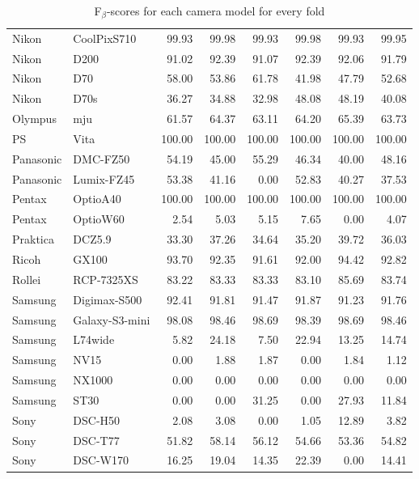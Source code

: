 \begin{table}[h]
{\begin{tabular}{|l|l|r|r|r|r|r|r|}
Nikon & CoolPixS710 & 99.93 & 99.98 & 99.93 & 99.98 & 99.93 & 99.95\\
Nikon & D200 & 91.02 & 92.39 & 91.07 & 92.39 & 92.06 & 91.79\\
Nikon & D70 & 58.00 & 53.86 & 61.78 & 41.98 & 47.79 & 52.68\\
Nikon & D70s & 36.27 & 34.88 & 32.98 & 48.08 & 48.19 & 40.08\\
Olympus & mju & 61.57 & 64.37 & 63.11 & 64.20 & 65.39 & 63.73\\
PS & Vita & 100.00 & 100.00 & 100.00 & 100.00 & 100.00 & 100.00\\
Panasonic & DMC-FZ50 & 54.19 & 45.00 & 55.29 & 46.34 & 40.00 & 48.16\\
Panasonic & Lumix-FZ45 & 53.38 & 41.16 & 0.00 & 52.83 & 40.27 & 37.53\\
Pentax & OptioA40 & 100.00 & 100.00 & 100.00 & 100.00 & 100.00 & 100.00\\
Pentax & OptioW60 & 2.54 & 5.03 & 5.15 & 7.65 & 0.00 & 4.07\\
Praktica & DCZ5.9 & 33.30 & 37.26 & 34.64 & 35.20 & 39.72 & 36.03\\
Ricoh & GX100 & 93.70 & 92.35 & 91.61 & 92.00 & 94.42 & 92.82\\
Rollei & RCP-7325XS & 83.22 & 83.33 & 83.33 & 83.10 & 85.69 & 83.74\\
Samsung & Digimax-S500 & 92.41 & 91.81 & 91.47 & 91.87 & 91.23 & 91.76\\
Samsung & Galaxy-S3-mini & 98.08 & 98.46 & 98.69 & 98.39 & 98.69 & 98.46\\
Samsung & L74wide & 5.82 & 24.18 & 7.50 & 22.94 & 13.25 & 14.74\\
Samsung & NV15 & 0.00 & 1.88 & 1.87 & 0.00 & 1.84 & 1.12\\
Samsung & NX1000 & 0.00 & 0.00 & 0.00 & 0.00 & 0.00 & 0.00\\
Samsung & ST30 & 0.00 & 0.00 & 31.25 & 0.00 & 27.93 & 11.84\\
Sony & DSC-H50 & 2.08 & 3.08 & 0.00 & 1.05 & 12.89 & 3.82\\
Sony & DSC-T77 & 51.82 & 58.14 & 56.12 & 54.66 & 53.36 & 54.82\\
Sony & DSC-W170 & 16.25 & 19.04 & 14.35 & 22.39 & 0.00 & 14.41\\
\hline
\end{tabular}
}
\caption{F$_\beta$-scores for each camera model for every fold}
\label{tab:fscore_everyclass_model}

\end{table}